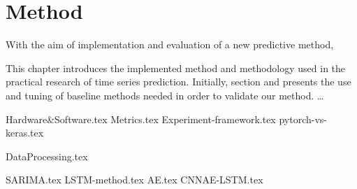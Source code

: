 \chapter{Method}
\label{section:Method}

With the aim of implementation and evaluation of a new predictive method,

This chapter introduces the implemented method and methodology used in the practical research of time series prediction.
Initially, section  and  presents the use and tuning of baseline methods needed in order to validate our method.
\dots


{Hardware&Software.tex}
{Metrics.tex}
{Experiment-framework.tex}
{pytorch-vs-keras.tex}

{DataProcessing.tex}


{SARIMA.tex}
{LSTM-method.tex}
{AE.tex}
{CNNAE-LSTM.tex}
